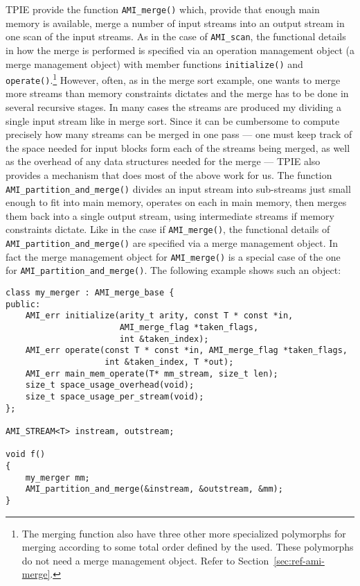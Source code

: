 TPIE provide the function \verb|AMI_merge()| which, provide that enough
main memory is available, merge a number of input streams into an output
stream in one scan of the input streams. As in the case of \verb|AMI_scan|,
the functional details in how the merge is performed is specified via an
operation management object (a merge
management object) with member functions \verb|initialize()| and
\verb|operate()|.\footnote{The merging function also have three other more
specialized polymorphs for merging according to some total order defined by
the used. These polymorphs do not need a merge management object. Refer to
Section~\ref{sec:ref-ami-merge}.} However, often, as in the merge sort
example, one wants to merge more streams than memory constraints dictates
and the merge has to be done in several recursive stages. In many cases the streams are produced my
dividing a single input stream like in merge sort. Since it can be
cumbersome to compute precisely how many streams can be merged in one pass
--- one must keep track of the space needed for input blocks form each of
the streams being merged, as well as the overhead of any data structures
needed for the merge --- TPIE also provides a mechanism that does most of
the above work for us. The function \verb|AMI_partition_and_merge()|
divides an input stream into sub-streams just small enough to fit into main
memory, operates on each in main memory, then merges them back into a
single output stream, using intermediate streams if memory constraints
dictate. Like in the case if \verb|AMI_merge()|, the functional details of
\verb|AMI_partition_and_merge()| are specified via a merge management
object. In fact the merge management object for \verb|AMI_merge()| is a
special case of the one for \verb|AMI_partition_and_merge()|. The following
example shows such an object:

\begin{verbatim}
class my_merger : AMI_merge_base {
public:
    AMI_err initialize(arity_t arity, const T * const *in,
                       AMI_merge_flag *taken_flags,
                       int &taken_index);
    AMI_err operate(const T * const *in, AMI_merge_flag *taken_flags,
                    int &taken_index, T *out);
    AMI_err main_mem_operate(T* mm_stream, size_t len);
    size_t space_usage_overhead(void);
    size_t space_usage_per_stream(void);
};

AMI_STREAM<T> instream, outstream;

void f() 
{
    my_merger mm;    
    AMI_partition_and_merge(&instream, &outstream, &mm);
}
\end{verbatim}

